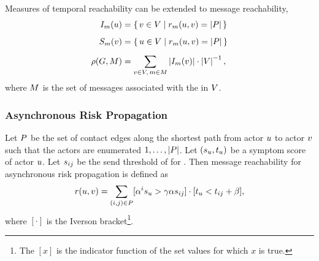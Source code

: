Measures of temporal reachability can be extended to message reachability,
\begin{align*}
  I_m(u) &= \set{ v\in V| r_m(u, v) = \left\vert P\right\vert} \\[5pt]
  S_m(v) &= \set{ u\in V| r_m(u, v) = \left\vert P\right\vert} \\[5pt]
  \rho(G, M) &= \sum_{v \in V, \,m \in M} \left\vert I_{m}(v) \right\vert \cdot \left\vert V \right\vert^{-1},
\end{align*}
where $M$ is the set of messages associated with the \verticesName in $V$.

\subsubsection*{Asynchronous Risk Propagation}

Let $P$ be the set of contact edges along the shortest path from actor $u$ to actor $v$ such that the actors are enumerated $1, \ldots, \left\vert P \right\vert$. Let $(s_u, t_u)$ be a symptom score of actor $u$. Let $s_{ij}$ be the send threshold of  for . Then message reachability for asynchronous risk propagation is defined as
\begin{equation}\label{eq:message-reachability}
  r(u, v) = \sum_{(i, j) \in P} [\alpha^i s_u > \gamma \alpha s_{ij}] \cdot [t_u < t_{ij} + \beta],
\end{equation}
where $[\cdot]$ is the Iverson bracket\footnote{The  $[x]$ is the indicator function of the set values for which $x$ is true.}.

